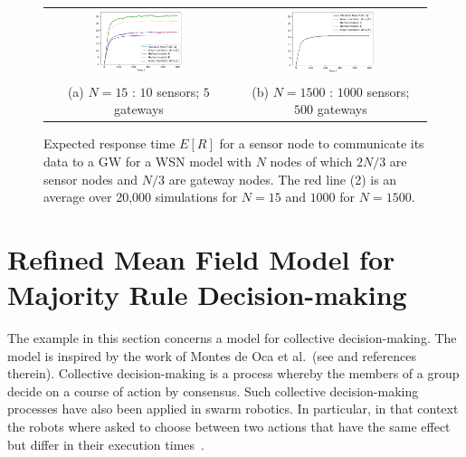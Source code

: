 \documentclass{amsart}
\begin{document}
\begin{figure}[ht]
\begin{center}
  \begin{tabular}{@{}c@{}c@{}}
    \includegraphics[width=0.5\textwidth]{WSNmodel_simu_N15}%
    &\includegraphics[width=0.5\textwidth]{WSNmodel_simu_N1500}\\%
    (a) $N=15$ : $10$ sensors; $5$ gateways
    &(b) $N=1500$ : $1000$ sensors; $500$ gateways
  \end{tabular}
\end{center}

\caption{\label{fig:wsn_res} Expected response time $E[R]$ for a
  sensor node to communicate its data to a GW for a WSN model with $N$
  nodes of which $2N/3$ are sensor nodes and $N/3$ are gateway
  nodes. The red line (2) is an average over 20,000 simulations for
  $N=15$ and $1000$ for $N=1500$.}
\end{figure}


\section{Refined Mean Field Model for Majority Rule Decision-making}
\label{sect:RefVoting}


The example in this section concerns a model for collective decision-making. The model is inspired by the work of Montes de Oca et al.~(see \cite{Mo+11,Sch11} and references therein). Collective decision-making is a process whereby the members of a group decide on a course of action by consensus. Such collective decision-making processes have also been applied in swarm robotics. In particular, in that context the robots where asked to choose between two actions that have the same effect but differ in their execution times~\cite{Mo+11}. 
\end{document}
